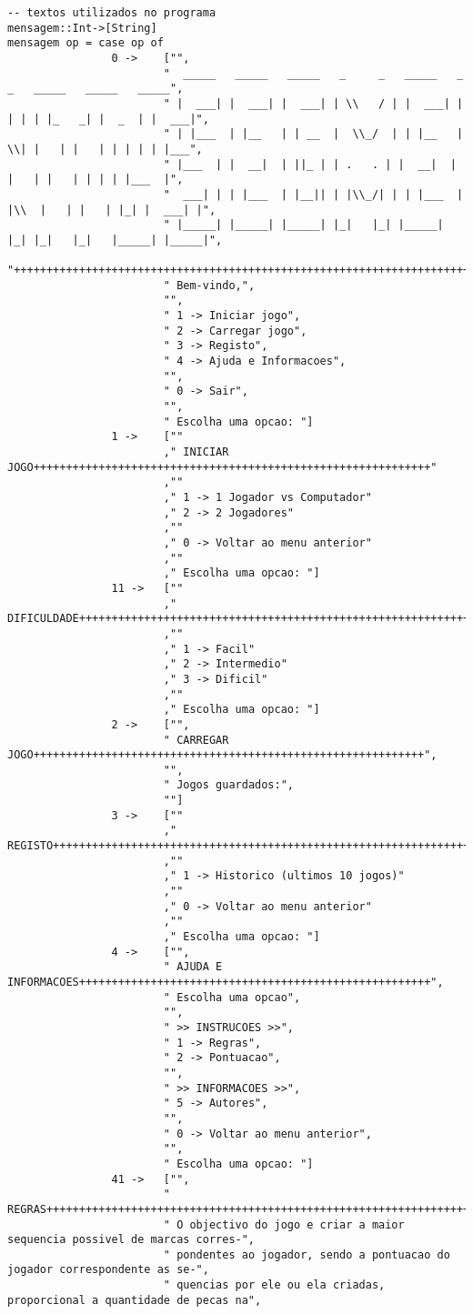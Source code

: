 \documentclass[a4paper,titlepage]{scrreprt}
\begin{document}
\begin{verbatim}
-- textos utilizados no programa
mensagem::Int->[String]
mensagem op = case op of
				0 ->	["",
						"  _____   _____   _____   _     _   _____   _   _   _____   _____   _____",
						" |  ___| |  ___| |  ___| | \\   / | |  ___| | | | | |_   _| |  _  | |  ___|",
						" | |___  | |__   | | __  |  \\_/  | | |__   |  \\| |   | |   | | | | | |___",
						" |___  | |  __|  | ||_ | | .   . | |  __|  |     |   | |   | | | | |___  |",
						"  ___| | | |___  | |__|| | |\\_/| | | |___  | |\\  |   | |   | |_| |  ___| |",
						" |_____| |_____| |_____| |_|   |_| |_____| |_| |_|   |_|   |_____| |_____|",
						"++++++++++++++++++++++++++++++++++++++++++++++++++++++++++++++++++++++++++",
						" Bem-vindo,",
						"",
						" 1 -> Iniciar jogo",
						" 2 -> Carregar jogo",
						" 3 -> Registo",
						" 4 -> Ajuda e Informacoes",
						"",
						" 0 -> Sair",
						"",
						" Escolha uma opcao: "]
				1 ->	[""
						," INICIAR JOGO+++++++++++++++++++++++++++++++++++++++++++++++++++++++++++++"
						,""
						," 1 -> 1 Jogador vs Computador"
						," 2 -> 2 Jogadores"
						,""
						," 0 -> Voltar ao menu anterior"
						,""
						," Escolha uma opcao: "]
				11 ->	[""
						," DIFICULDADE++++++++++++++++++++++++++++++++++++++++++++++++++++++++++++++"
						,""
						," 1 -> Facil"
						," 2 -> Intermedio"
						," 3 -> Dificil"
						,""
						," Escolha uma opcao: "]
				2 ->	["",
						" CARREGAR JOGO++++++++++++++++++++++++++++++++++++++++++++++++++++++++++++",
						"",
						" Jogos guardados:",
						""]
				3 ->	[""
						," REGISTO++++++++++++++++++++++++++++++++++++++++++++++++++++++++++++++++++"
						,""
						," 1 -> Historico (ultimos 10 jogos)"
						,""
						," 0 -> Voltar ao menu anterior"
						,""
						," Escolha uma opcao: "]
				4 ->	["",
						" AJUDA E INFORMACOES++++++++++++++++++++++++++++++++++++++++++++++++++++++",
						" Escolha uma opcao",
						"",
						" >> INSTRUCOES >>",
						" 1 -> Regras",
						" 2 -> Pontuacao",
						"",
						" >> INFORMACOES >>",
						" 5 -> Autores",
						"",
						" 0 -> Voltar ao menu anterior",
						"",
						" Escolha uma opcao: "]
				41 ->	["",
						" REGRAS+++++++++++++++++++++++++++++++++++++++++++++++++++++++++++++++++++",
						" O objectivo do jogo e criar a maior sequencia possivel de marcas corres-",
						" pondentes ao jogador, sendo a pontuacao do jogador correspondente as se-",
						" quencias por ele ou ela criadas, proporcional a quantidade de pecas na",

\end{verbatim}
\end{document}
